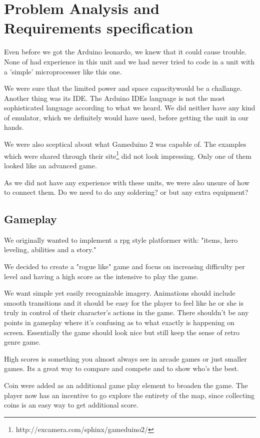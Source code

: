 \chapter{Problem Analysis and Requirements specification}

Even before we got the Arduino leonardo, we knew that it could cause trouble. None of had experience in this unit and
we had never tried to code in a unit with a 'simple'
microprocesser like this one.

We were sure that the limited power and space capacitywould be a challange. Another thing was its IDE. The Arduino IDEs language is not the most
sophisticated language according to what we heard. We did neither have any kind of emulator, which we definitely would have used, before getting the unit in our hands.

We were also sceptical about what Gameduino 2 was capable of. The examples
which were shared through their site\footnote{http://excamera.com/sphinx/gameduino2/} did not look impressing. Only one of them
looked like an advanced game.

As we did not have any experience with these units, we were also unsure of how to connect them. Do we need to do any soldering? or but any extra equipment?

\newpage

\section{Gameplay}%
We originally wanted to implement a rpg style platformer with: "items, hero leveling, abilities and a story."

We decided to create a "rogue like" game and focus on increasing difficulty per level and having a high score as the intensive to play the game.

We want simple yet easily recognizable imagery. Animations should include smooth transitions and it should be easy for the player to feel like he or she is truly in control of their character's actions in the game. There shouldn't be any points in gameplay where it's confusing as to what exactly is happening on screen. Essentially the game should look nice but still keep the sense of retro genre game.
 
High scores is something you almost always see in arcade games or just smaller games. Its a great way to compare and compete and to show who's the best.

Coin were added as an additional game play element to broaden the game. The player now has an incentive to go explore the entirety of the map, since collecting coins is an easy way to get additional score.
